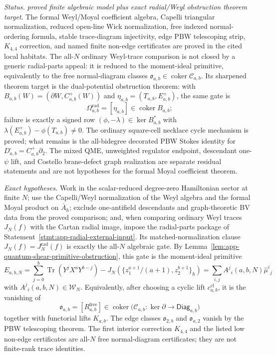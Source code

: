 \begin{stmt}\label{thm:lane-moyal-degree-zero}
  \emph{Status.} \emph{proved finite algebraic model plus exact
  radial/Weyl obstruction theorem target}.  The formal Weyl/Moyal
  coefficient algebra, Capelli triangular normalization, reduced open-line
  Wick normalization, free indexed normal-ordering formula, stable
  trace-diagram injectivity, edge PBW telescoping strip, \(K_{4,4}\)
  correction, and named finite non-edge certificates are proved in the
  cited local habitats.  The all-\(N\) ordinary Weyl-trace comparison is
  not closed by a generic radial-parts appeal: it is reduced to the
  moment-ideal primitive, equivalently to the free normal-diagram classes
  \(\mathfrak o_{a,b}\in\operatorname{coker}\mathcal C_{a,b}\).  Its
  sharpened theorem target is the dual-potential obstruction theorem:
  with
  \(B_{a,b}(W)=(\partial W,C^+_{a,b}(W))\) and
  \(\eta_{a,b}=(T_{a,b},E^+_{a,b})\), the same gate is
  \[
    \Omega^{\mathrm{rad}}_{a,b}
    =
    [\eta_{a,b}]\in\operatorname{coker}B_{a,b};
  \]
  failure is exactly a signed row
  \((\phi,-\lambda)\in\ker B_{a,b}^*\) with
  \(\lambda(E^+_{a,b})-\phi(T_{a,b})\ne0\).  The ordinary square-cell
  necklace cycle mechanism is proved; what remains is the all-bidegree
  decorated PBW Stokes identity for
  \(D^\square_{a,b}=C^+_{a,b}\partial_2\).  The mixed QME,
  unweighted regulator endpoint, descendant one-\(\psi\) lift, and
  Costello brane-defect graph realization are separate residual statements
  and are not hypotheses for the formal Moyal coefficient theorem.

  \emph{Exact hypotheses.} Work in the scalar-reduced degree-zero
  Hamiltonian sector at finite \(N\); use the Capelli/Weyl normalization
  of the Weyl algebra and the formal Moyal product on \(\bar A_\hbar\);
  exclude one-antifield descendants and graph-theoretic BV data from the
  proved comparison; and, when comparing ordinary Weyl traces \(J_N(f)\)
  with the Cartan radial image, impose the radial-parts package of
  Statement~\ref{stmt:app-radial-external-input}.  Its matched-normalization
  clause \(J_N(f)=J_N^{\mathrm{rad}}(f)\) is exactly the all-\(N\) algebraic
  gate.  By Lemma~\ref{lem:app-quantum-shear-primitive-obstruction}, this
  gate is the moment-ideal primitive
  \[
    E_{a,b,N}
      =
      \sum_{j=0}^{b}\operatorname{Tr}(Y^jX^aY^{b-j})
      -
      J_N\!\left(
        \{z_1^{a+1}/(a+1),z_2^{b+1}\}_\hbar
      \right)
      =
      \sum_{i,j}A^j{}_i(a,b,N)\widehat\mu^i{}_j
  \]
  with \(A^j{}_i(a,b,N)\in\mathcal W_N\).  Equivalently, after choosing a
  cyclic lift \(c^{\mathrm{cl}}_{a,b}\), it is the vanishing of
  \[
    \mathfrak o_{a,b}
      =
      [R^{\mathrm{free}}_{a,b}]
      \in\operatorname{coker}
      \bigl(\mathcal C_{a,b}\colon\ker\partial\to
      \mathsf{Diag}_{a,b}\bigr)
  \]
  together with functorial lifts \(K_{a,b}\).  The edge classes
  \(\mathfrak o_{2,b}\) and \(\mathfrak o_{a,2}\) vanish by the PBW
  telescoping theorem.  The first interior correction \(K_{4,4}\) and the
  listed low non-edge certificates are all-\(N\) free normal-diagram
  certificates; they are not finite-rank trace identities.


\end{stmt}
